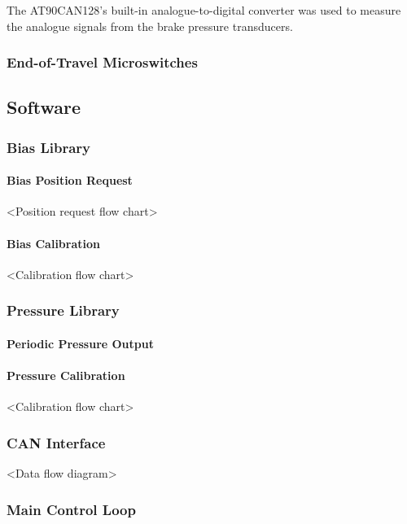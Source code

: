 The AT90CAN128's built-in analogue-to-digital converter was used to measure the analogue signals from the brake pressure transducers.

\subsubsection{End-of-Travel Microswitches}



\subsection{Software}


\subsubsection{Bias Library}


\paragraph{Bias Position Request}

<Position request flow chart>


\paragraph{Bias Calibration}

<Calibration flow chart>


\subsubsection{Pressure Library}


\paragraph{Periodic Pressure Output}


\paragraph{Pressure Calibration}

<Calibration flow chart>


\subsubsection{CAN Interface}

<Data flow diagram>


\subsubsection{Main Control Loop}